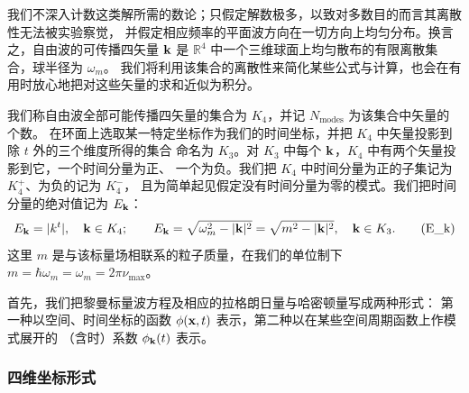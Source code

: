 我们不深入计数这类解所需的数论；只假定解数极多，以致对多数目的而言其离散性无法被实验察觉，
并假定相应频率的平面波方向在一切方向上均匀分布。换言之，自由波的可传播四矢量 $\mathbf{k}$
是 $\mathbb{R}^{4}$ 中一个三维球面上均匀散布的有限离散集合，球半径为 $\omega_{m}$。
我们将利用该集合的离散性来简化某些公式与计算，也会在有用时放心地把对这些矢量的求和近似为积分。

我们称自由波全部可能传播四矢量的集合为 $K_{4}$，并记 $N_{\text{modes}}$ 为该集合中矢量的个数。
在环面上选取某一特定坐标作为我们的时间坐标，并把 $K_{4}$ 中矢量投影到除 $t$ 外的三个维度所得的集合
命名为 $K_{3}$。对 $K_{3}$ 中每个 $\mathbf{k}$，$K_{4}$ 中有两个矢量投影到它，一个时间分量为正、
一个为负。我们把 $K_{4}$ 中时间分量为正的子集记为 $K_{4}^{+}$、为负的记为 $K_{4}^{-}$，
且为简单起见假定没有时间分量为零的模式。我们把时间分量的绝对值记为 $E_{\mathbf{k}}$：
\begin{equation}
E_{\mathbf{k}}=|k^{t}|,\quad \mathbf{k}\in K_{4};
\qquad
E_{\mathbf{k}}=\sqrt{\omega_{m}^{2}-|\mathbf{k}|^{2}}=\sqrt{m^{2}-|\mathbf{k}|^{2}},\quad \mathbf{k}\in K_{3}.
\tag{E\_k}
\end{equation}
这里 $m$ 是与该标量场相联系的粒子质量，在我们的单位制下
$m=\hbar\omega_{m}=\omega_{m}=2\pi\nu_{\max}$。

首先，我们把黎曼标量波方程及相应的拉格朗日量与哈密顿量写成两种形式：
第一种以空间、时间坐标的函数 $\phi(\mathbf{x},t)$ 表示，第二种以在某些空间周期函数上作模式展开的
（含时）系数 $\phi_{\mathbf{k}}(t)$ 表示。

\subsubsection*{四维坐标形式}

